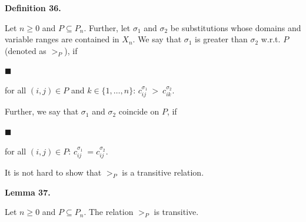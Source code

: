  
 
\par\medskip\noindent\textbf{Definition 36.}\par
 
 
Let $n\geq 0$ and $P\subseteq P_{n}$. Further, let $\sigma_{1}$ and $\sigma_{2}$ be substitutions whose domains and variable ranges are contained in $X_{n}$. We say that $\sigma_{1}$ is greater than $\sigma_{2}$ w.r.t. $P$ (denoted as $>_{P}$), if\par
  
\par\noindent  $\blacksquare$ 
 
for all $(i,j)\in P$ and $k\in\{1,\ldots,n\}$: $c^{\sigma_{1}}_{ij}\ >\ c^{\sigma_{2}}_{ik}$.\par
 
 
  
Further, we say that $\sigma_{1}$ and $\sigma_{2}$ coincide on $P$, if\par
  
\par\noindent  $\blacksquare$ 
 
for all $(i,j)\in P$: $c^{\sigma_{1}}_{ij}\ =c^{\sigma_{2}}_{ij}$.\par
 
 
  
 
 
 
It is not hard to show that $>_{P}$ is a transitive relation.\par
 
 
 
\par\medskip\noindent\textbf{Lemma 37.}\par
 
 
Let $n\geq 0$ and $P\subseteq P_{n}$. The relation $>_{P}$ is transitive.\par
 
 
 
 
